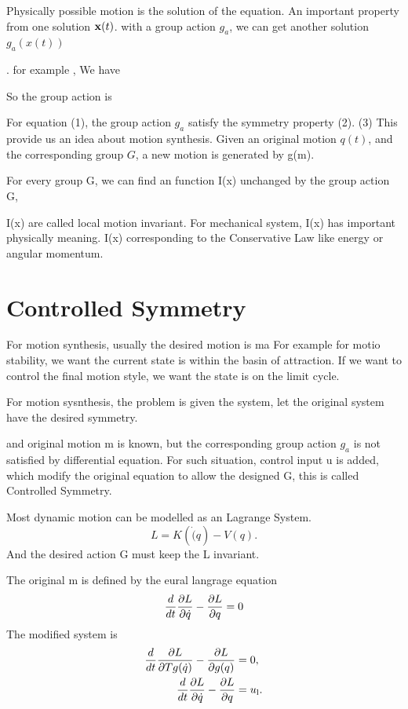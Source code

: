 Physically possible motion is the solution of the equation.
An important property from one solution $\mathbf{x}(t)$.
with a group action $g_a$, we can get another solution $g_a(x(t))$
 	
.
for example
, 
We have 

So the group action is


For equation (1), the group action $g_a$ satisfy the symmetry property (2).
	(3)
This provide us an idea about motion synthesis.
Given an original motion $q(t)$, and the corresponding group $G$, a new motion is generated by g(m).

For every group G, we can find an function I(x) unchanged by the group action G, 

I(x) are called local motion invariant. 
For mechanical system,  I(x) has important physically meaning. 
I(x) corresponding to the Conservative Law like energy or angular momentum.
\section{Controlled Symmetry}

For motion synthesis, usually the desired motion is ma
For example for motio stability, we want the current state is within the basin of attraction.
If we want to control the final motion style, we want the state is on the limit cycle.

For motion sysnthesis, the problem is given the system, let the original system have the desired symmetry.

 and original motion m is  known, but the corresponding group action $g_a$ is not satisfied by differential equation.
For such situation, control input u  is added, which modify the original equation to allow the designed G, this is called Controlled Symmetry.

Most dynamic motion can be modelled as an Lagrange System. 
\[
L=K(\dot(q)-V(q).
\]
And the desired action G must keep the L invariant. 

The original m is defined by the eural langrage equation
\begin{equation}
\frac{d}{dt} \frac{\partial L}{\partial \dot{q}} - \frac{\partial L}{\partial q} = 0
\label{eq:uncontrolled_euler_lagrange}
\end{equation}
The modified system is 
\begin{align}
\frac{d}{dt} \frac{\partial L}{\partial Tg(\dot{q})} - \frac{\partial L}{\partial g(q)}&=0,\label{eq:liegroup_euler_lagrange}\\
\frac{d}{dt} \frac{\partial L}{\partial \dot{q}} - \frac{\partial L}{\partial q}&=u_{\mathrm{l}}. \label{eq:controlled_euler_lagrange}
\end{align}


